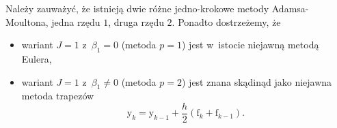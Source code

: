 \documentclass[paper=a4,DIV=12]{tmmlab}
\newcommand{\brm}[1]{\bm{\mathrm{#1}}}
\begin{document}
\begin{appendices}
Należy zauważyć, że istnieją dwie różne jedno-krokowe metody Adamsa-Moultona,
jedna rzędu $1$, druga rzędu $2$. Ponadto dostrzeżemy, że
\begin{itemize}
  \item wariant $J=1$ z~$\beta_1 = 0$ (metoda $p=1$) jest w~istocie niejawną
        metodą Eulera,
  \item wariant $J=1$ z~$\beta_1 \neq 0$ (metoda $p=2$) jest znana skądinąd jako
        niejawna metoda trapezów
        \begin{equation}
          \brm{y}_k = \brm{y}_{k-1} + \frac{h}{2} \left(\brm{f}_{k} + \brm{f}_{k-1}\right).
          \label{eq:GY62E}
        \end{equation}
\end{itemize}


\end{appendices}



\end{document}
